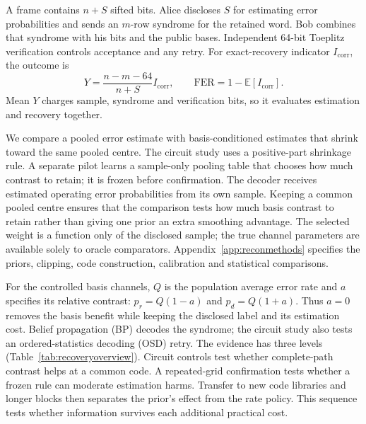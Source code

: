\documentclass[manuscript,screen,review,anonymous]{acmart}
\begin{document}
A frame contains $n+S$ sifted bits. Alice discloses $S$ for estimating error
probabilities and sends an $m$-row syndrome for the retained word.
Bob combines that syndrome with his bits and the public bases. Independent
64-bit Toeplitz verification controls acceptance and any retry.
For exact-recovery indicator $I_{\mathrm{corr}}$, the outcome is
\begin{equation}
 Y=\frac{n-m-64}{n+S}I_{\mathrm{corr}},\qquad
 \mathrm{FER}=1-\mathbb E[I_{\mathrm{corr}}].
 \label{eq:yield}
\end{equation}
Mean $Y$ charges sample, syndrome and verification bits, so it evaluates
estimation and recovery together.

We compare a pooled error estimate with basis-conditioned estimates that
shrink toward the same pooled centre. The circuit study uses a positive-part
shrinkage rule. A separate pilot learns a sample-only pooling table that
chooses how much contrast to retain; it is frozen before confirmation.
The decoder receives estimated operating error probabilities from its own
sample. Keeping a common pooled centre ensures that the comparison tests
how much basis contrast to retain rather than giving one prior an extra
smoothing advantage. The selected weight is a function only of the disclosed
sample; the true channel parameters are available solely to oracle comparators.
Appendix~\ref{app:reconmethods} specifies the priors, clipping,
code construction, calibration and statistical comparisons.

For the controlled basis channels, $Q$ is the population average error rate
and $a$ specifies its relative contrast: $p_r=Q(1-a)$ and $p_d=Q(1+a)$.
Thus $a=0$ removes the basis benefit while keeping the disclosed label and its
estimation cost. Belief propagation (BP) decodes the syndrome; the circuit
study also tests an ordered-statistics decoding (OSD) retry.
The evidence has three levels (Table~\ref{tab:recoveryoverview}).
Circuit controls test whether complete-path contrast helps at a common code.
A repeated-grid confirmation tests whether a frozen rule can moderate
estimation harms. Transfer to new code libraries and longer blocks then
separates the prior's effect from the rate policy. This sequence tests
whether information survives each additional practical cost.
\end{document}

